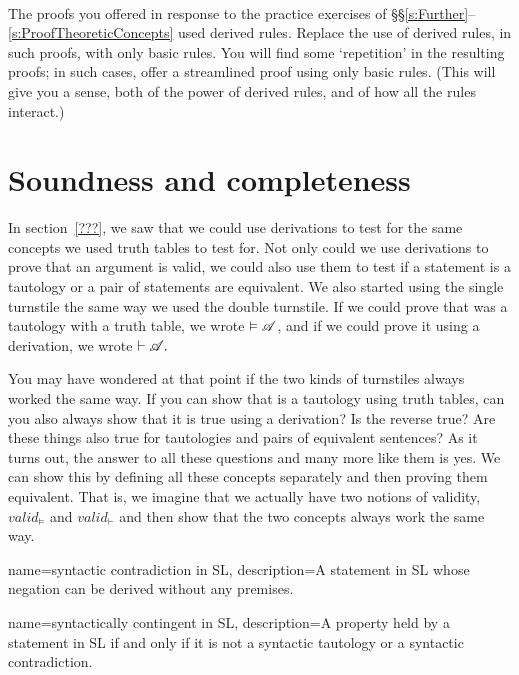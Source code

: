 \

\problempart
The proofs you offered in response to the practice exercises of \S\S\ref{s:Further}--\ref{s:ProofTheoreticConcepts} used derived rules. Replace the use of derived rules, in such proofs, with only basic rules. You will find some `repetition' in the resulting proofs; in such cases, offer a streamlined proof using only basic rules.  (This will give you a sense, both of the power of derived rules, and of how all the rules interact.)

\chapter{Soundness and completeness}
\label{sec:soundness_and_completeness}

In section~\ref{???}, we saw that we could use derivations to test for the same concepts we used truth tables to test for. Not only could we use derivations to prove that an argument is valid, we could also use them to test if a statement is a tautology or a pair of statements are equivalent. We also started using the single turnstile the same way we used the double turnstile. If we could prove that  was a tautology with a truth table, we wrote $\vDash \mathscr{A}$, and if we could prove it using a derivation, we wrote $\vdash \mathscr{A}.$ 

You may have wondered at that point if the two kinds of turnstiles always worked the same way. If you can show that  is a tautology using truth tables, can you also always show that it is true using a derivation? Is the reverse true? Are these things also true for tautologies and pairs of equivalent sentences? As it turns out, the answer to all these questions and many more like them is yes. We can show this by defining all these concepts separately and then proving them equivalent. That is, we imagine that we actually have two notions of validity, $valid_{\models}$ and  $valid_{\vdash}$ and then show that the two concepts always work the same way. 

{
name=syntactic contradiction in SL,
description={A statement in SL whose negation can be derived without any premises.}
}


   
{
name=syntactically contingent in SL,
description={A property held by a statement in SL if and only if it is not a syntactic tautology or a syntactic contradiction.}
}




